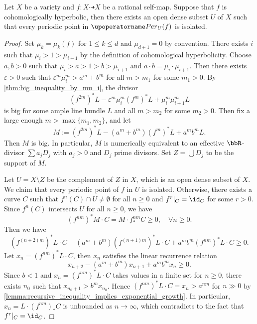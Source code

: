 \begin{proposition}\label{prop:isolated_periodic_points_for_cohomologically_hyperbolic_maps}
	Let $X$ be a variety and $f: X \dashrightarrow X$ be a rational self-map.
	Suppose that $f$ is cohomologically hyperbolic, then there exists an open dense subset $U$ of $X$ such that every periodic point in $\Per_U(f)$ is isolated.
\end{proposition}
\begin{proof}
	Set $\mu_k = \mu_k(f)$ for $1 \leq k \leq d$ and $\mu_{d+1} = 0$ by convention.
	There exists $i$ such that $\mu_i > 1 > \mu_{i+1}$ by the definition of cohomological hyperbolicity.
	Choose $a,b > 0$ such that $\mu_i > a > 1 > b > \mu_{i+1}$ and $a \cdot b = \mu_i \cdot \mu_{i+1}$.
	Then there exists $\varepsilon > 0$ such that $\varepsilon^m \mu_i^m > a^m + b^m$ for all $m > m_1$ for some $m_1 > 0$.
	By \cref{thm:big_inequality_by_mu_i}, the divisor
	\[ (f^{2m})^*L - \varepsilon^m \mu_i^m (f^m)^*L + \mu_i^m \mu_{i+1}^m L \]
	is big for some ample line bundle $L$ and all $m > m_2$ for some $m_2 > 0$.
	Then fix a large enough $m > \max\{m_1, m_2\}$, and let
	\[ M := (f^{2m})^*L - (a^m + b^m) (f^m)^*L + a^m b^m L. \]
	Then $M$ is big.
	In particular, $M$ is numerically equivalent to an effective $\bbR$-divisor $\sum a_j D_j$ with $a_j > 0$ and $D_j$ prime divisors.
	Set $Z = \bigcup D_j$ to be the support of $M$.

	Let $U = X \setminus Z$ be the complement of $Z$ in $X$, which is an open dense subset of $X$.
	We claim that every periodic point of $f$ in $U$ is isolated.
	Otherwise, there exists a curve $C$ such that $f^n(C) \cap U \neq \emptyset$ for all $n \geq 0$ and $f^r|_C = \id_C$ for some $r > 0$.
	Since $f^{n}(C)$ intersects $U$ for all $n \geq 0$, we have
	\begin{equation}\label{eq:inequality_for_curve_C_in_proof_of_isolated_periodic_points_for_cohomologically_hyperbolic_maps}
		(f^{n m})^*M \cdot C = M \cdot f^{n m}_*C \geq 0, \quad \forall n \geq 0.
	\end{equation}
	Then we have
	\[ (f^{(n+2)m})^*L \cdot C - (a^m + b^m) (f^{(n +1)m})^*L \cdot C + a^m b^m (f^{n m})^*L \cdot C \geq 0. \]
	Let $x_{n} = (f^{nm})^*L \cdot C$, then $x_n$ satisfies the linear recurrence relation
	\[ x_{n+2} - (a^m + b^m) x_{n+1} + a^m b^m x_n \geq 0. \]
	Since $b<1$ and $x_n = (f^{nm})^*L \cdot C$ takes values in a finite set for $n \geq 0$, there exists $n_0$ such that $x_{n_0+1} > b^m x_{n_0}$.
	Hence $(f^{nm})^*L \cdot C = x_n >  a^{nm}$ for $n \gg 0$ by \cref{lemma:recursive_inequality_implies_exponential_growth}.
	In particular, $x_n = L \cdot (f^{nm})_*C$ is unbounded as $n \to \infty$, which contradicts to the fact that $f^r|_C = \id_C$.
\end{proof}

